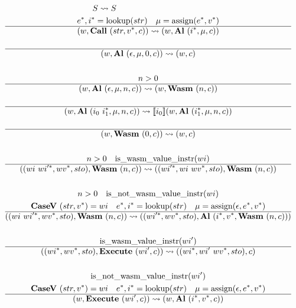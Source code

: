 \begin{gather*}
\newline \\
  S \leadsto S
%
\newline \\
  \seq e, \seq i = \lookup(str) \quad \mu = \assign(\seq e, \seq v) \\
  \hline
  (w, \call ~ (str, \seq v, c)) \leadsto (w, \al ~ (\seq i, \mu, c)) \\
%
\newline \\
  \hline
  (w, \al ~ (\epsilon, \mu, 0, c)) \leadsto (w, c) \\
%
\newline \\
  n > 0 \\
  \hline
  (w, \al ~ (\epsilon, \mu, n, c)) \leadsto (w, \wasm ~ (n, c)) \\
%
\newline \\
  \hline
  (w, \al ~ (i_0 ~ \seq{i_1}, \mu, n, c)) \leadsto \sem{i_0}(w, \al ~ (\seq{i_1}, \mu, n, c)) \\
%
\newline \\
  \hline
  (w, \wasm ~ (0, c)) \leadsto (w, c) \\
%
\newline \\
  n > 0 \quad \iswasmvalueinstr(wi) \\
  \hline
  ((wi ~ \seq{wi'}, \seq{wv}, sto), \wasm ~ (n, c))
  \leadsto
  ((\seq{wi'}, wi ~ \seq{wv}, sto), \wasm ~ (n, c)) \\
%
\newline \\
  n > 0 \quad \isnotwasmvalueinstr(wi) \\
  \casev ~ (str, \seq v) = wi \quad
  \seq e, \seq i = \lookup(str) \quad
  \mu = \assign(\epsilon, \seq e, \seq v) \\
  \hline
  ((wi ~ \seq{wi'}, \seq{wv}, sto), \wasm ~ (n, c))
  \leadsto
  ((\seq{wi'}, \seq{wv}, sto), \al ~ (\seq i, \seq v, \wasm ~ (n, c))) \\
%
\newline \\
  \iswasmvalueinstr(wi') \\
  \hline
  ((\seq{wi}, \seq{wv}, sto), \exe ~ (wi', c))
  \leadsto
  ((\seq{wi}, wi' ~ \seq{wv}, sto), c) \\
%
\newline \\
  \isnotwasmvalueinstr(wi') \\
  \casev ~ (str, \seq v) = wi \quad
  \seq e, \seq i = \lookup(str) \quad
  \mu = \assign(\epsilon, \seq e, \seq v) \\
  \hline
  (w, \exe ~ (wi', c)) \leadsto (w, \al ~ (\seq i, \seq v, c)) \\
\end{gather*}




